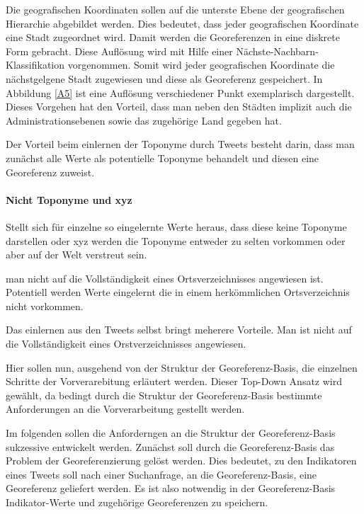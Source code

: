 				Die geografischen Koordinaten sollen auf die unterste Ebene der geografischen Hierarchie abgebildet werden. 
				Dies bedeutet, dass jeder geografischen Koordinate eine Stadt zugeordnet wird.
				Damit werden die Georeferenzen in eine diskrete Form gebracht.  
				Diese Auflösung wird mit Hilfe einer Nächste-Nachbarn-Klassifikation vorgenommen.
				Somit wird jeder geografischen Koordinate die nächstgelgene Stadt zugewiesen und diese als Georeferenz gespeichert. 
				In Abbildung \ref{A5} ist eine Auflösung verschiedener Punkt exemplarisch dargestellt. 
				Dieses Vorgehen hat den Vorteil, dass man neben den Städten implizit auch die Administrationsebenen sowie das zugehörige Land gegeben hat.













				Der Vorteil beim einlernen der Toponyme durch Tweets besteht darin, dass man zunächst alle Werte als potentielle Toponyme behandelt und diesen eine Georeferenz zuweist.

				\paragraph{Nicht Toponyme und xyz} 
				Stellt sich für einzelne so eingelernte Werte heraus, dass diese keine Toponyme darstellen oder xyz werden die Toponyme entweder zu selten vorkommen oder aber auf der Welt verstreut sein.   

				man nicht auf die Vollständigkeit eines Ortsverzeichnisses angewiesen ist.
				Potentiell werden Werte eingelernt die in einem herkömmlichen Ortsverzeichnis nicht vorkommen.   

				Das einlernen aus den Tweets selbst bringt meherere Vorteile. 
				Man ist nicht auf die Vollständigkeit eines Orstverzeichnisses angewiesen.
				
 
				Hier sollen nun, ausgehend von der Struktur der Georeferenz-Basis, die einzelnen Schritte der Vorverarebitung erläutert werden. 
				Dieser Top-Down Ansatz wird gewählt, da bedingt durch die Struktur der Georeferenz-Basis bestimmte Anforderungen an die Vorverarbeitung gestellt werden.

				Im folgenden sollen die Anforderngen an die Struktur der Georeferenz-Basis sukzessive entwickelt werden.
				Zunächst soll durch die Georeferenz-Basis das Problem der Georeferenzierung gelöst werden. 
				Dies bedeutet, zu den Indikatoren eines Tweets soll nach einer Suchanfrage, an die Georeferenz-Basis, eine Georeferenz geliefert werden.
				Es ist also notwendig in der Georeferenz-Basis Indikator-Werte und zugehörige Georeferenzen zu speichern.



